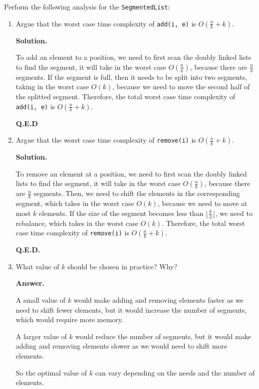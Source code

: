 \documentclass{article}
\begin{document}
Perform the following analysis for the \texttt{SegmentedList}:
\begin{enumerate}
    \item Argue that the worst case time complexity of \texttt{add(i, e)} is $O(\frac{n}{k} + k)$.

    \textbf{Solution.}

    To add an element to a position, we need to first scan the doubly linked lists to find the segment, it will take in the worst case $O(\frac{n}{k})$, because there are $\frac{n}{k}$ segments. If the segment is full, then it needs to be split into two segments, taking in the worst case $O(k)$, because we need to move the second half of the splitted segment. Therefore, the total worst case time complexity of \texttt{add(i, e)} is $O(\frac{n}{k} + k)$.

    \textbf{Q.E.D}
    
    \item Argue that the worst case time complexity of \texttt{remove(i)} is $O(\frac{n}{k} + k)$.

    \textbf{Solution.}

    To remove an element at a position, we need to first scan the doubly linked lists to find the segment, it will take in the worst case $O(\frac{n}{k})$, because there are $\frac{n}{k}$ segments. Then, we need to shift the elements in the corresponding segment, which takes in the worst case $O(k)$, because we need to move at most $k$ elements. If the size of the segment becomes less than $\lfloor\frac{k}{2}\rfloor$, we need to rebalance, which takes in the worst case $O(k)$. Therefore, the total worst case time complexity of \texttt{remove(i)} is $O(\frac{n}{k} + k)$.

    \textbf{Q.E.D.}
    
    \item What value of $k$ should be chosen in practice? Why?

    \textbf{Answer.}
    
    A small value of $k$ would make adding and removing elements faster as we need to shift fewer elements, but it would increase the number of segments, which would require more memory.
    
    A larger value of $k$ would reduce the number of segments, but it would make adding and removing elements slower as we would need to shift more elements.

    So the optimal value of $k$ can vary depending on the needs and the number of elements.
    
\end{enumerate}
\end{document}
